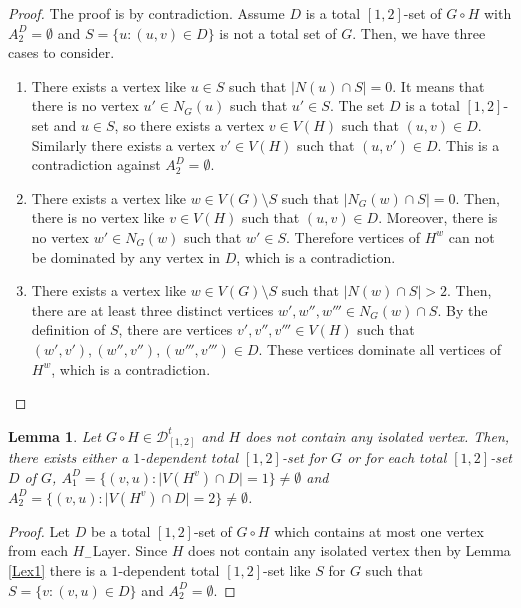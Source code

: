 \documentclass[A4,12pt]{article}
\newtheorem{lemma}[theorem]{Lemma}
\theoremstyle{definition}
\theoremstyle{remark}
\begin{document}
\begin{proof}
The proof is by contradiction. Assume $D$ is a total $[1,2]$-set of $G\circ H$ with $A_2^D=\emptyset$ and $S=\{u:(u,v)\in D\}$ is not a total set of $G$. Then, we have  three cases to consider.

	\begin{enumerate}


\item
There exists a vertex like $u\in S$ such that $\vert N(u) \cap S \vert=0$. It means that there is no vertex $u' \in N_G(u)$ such that $u'\in S$. The set $D$ is a total $[1,2]$-set and $u\in S$, so there exists a vertex $v\in V(H)$ such that $(u,v)\in D$. Similarly there exists a vertex $v' \in V(H)$ such that $(u,v')\in D$. This is a contradiction against $A_2^D=\emptyset$.
\item
There exists a vertex like $w\in V(G)\setminus S$ such that $\vert N_G(w) \cap S \vert=0$. Then, there is no vertex like $v\in V(H)$ such that $(u,v)\in D$. Moreover, there is no vertex $w' \in N_G(w)$ such that $w'\in S$.  Therefore vertices of $H^w$ can not be dominated by any vertex in $D$, which is a contradiction.
 \item
There exists a vertex like $w\in V(G)\setminus S$ such that $\vert N(w) \cap S \vert >2$. Then, there are at least three distinct vertices $w',w'',w'''\in N_G(w)\cap S$. By the definition of   $S$, there are vertices $v',v'',v''' \in V(H)$ such that $(w',v'),(w'',v''), (w''',v''')\in D$. These vertices dominate all vertices of $H^w$, which is a contradiction.
\end{enumerate}
\end{proof}

\begin{lemma}\label{Lex1and2a}
Let $G \circ H \in \mathcal{D}^t_{[1,2]}$ and $H$ does not contain any isolated vertex. Then, there exists either a $1$-dependent total $[1,2]$-set for $G$ or for each total $[1,2]$-set $D$ of $G$, $A_1^D=\{(v,u):\vert V(H^v)\cap D\vert=1\}\neq \emptyset$ and $A_2^D=\{(v,u):\vert V(H^v)\cap D\vert =2\} \neq \emptyset $.
\end{lemma}
\begin{proof}
Let  $D$ be a total $[1,2]$-set  of $G \circ H $ which contains at most one vertex from each $H_{-}$Layer. Since $H$ does not contain any isolated vertex then by Lemma \ref{Lex1} there is a $1$-dependent  total $[1,2]$-set like $S$ for $G$ such that $S=\{v: (v,u)\in D\}$  and  $A_2^D=\emptyset$.
\end{proof}
\end{document}
